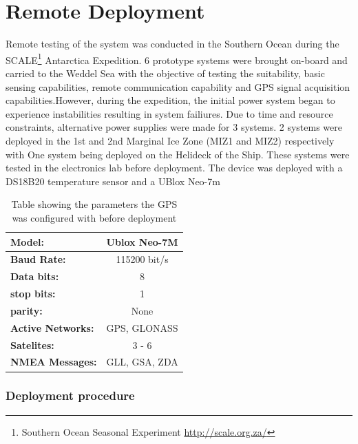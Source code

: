 \section{Remote Deployment}
\label{sec:ch4_remotedeployment}
Remote testing of the system was conducted in the Southern Ocean during the SCALE\footnote{Southern Ocean Seasonal Experiment \url{http://scale.org.za/}} Antarctica Expedition. 6 prototype systems were brought on-board and carried to the Weddel Sea with the objective of testing the suitability, basic sensing capabilities, remote communication capability and GPS signal acquisition capabilities.However, during the expedition, the initial power system began to experience instabilities resulting in system failiures. Due to time and resource constraints, alternative power supplies were made for 3 systems. 2 systems were deployed in the 1st and 2nd Marginal Ice Zone (MIZ1 and MIZ2) respectively with One system being deployed on the Helideck of the Ship. These systems were tested in the electronics lab before deployment. The device was deployed with a DS18B20 temperature sensor and a UBlox Neo-7m 

\begin{table}[H]
    \centering
    \caption{Table showing the parameters the GPS was configured with before deployment }
    \begin{tabular}{|l|c|}
    \hline
    \textbf{Model:} & Ublox Neo-7M \\
    \hline
       \textbf{Baud Rate:}  & 115200 bit/s \\
       \hline
       \textbf{Data bits:} & 8 \\
       \hline
       \textbf{stop bits:} & 1 \\
       \hline
       \textbf{parity:} & None \\
       \hline
       \textbf{Active Networks:} & GPS, GLONASS \\
       \hline
       \textbf{Satelites:} & 3 - 6 \\
       \hline
       \textbf{NMEA Messages:} & GLL, GSA, ZDA \\
       \hline
    \end{tabular}

    \label{tab:test_remotetest_gpsconfig}
\end{table}

\subsubsection{Deployment procedure}

